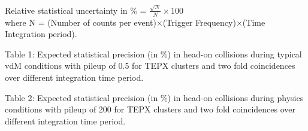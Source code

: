 Relative statistical uncertainty in $\%$ = $\frac{\sqrt{N}}{N} \times 100$ \\

where N = (Number of counts per event)$\times$(Trigger Frequency)$\times$(Time Integration period). \\

\newpage
\begin{flushleft} 
  Table 1: Expected statistical precision (in $\%$) in head-on collisions during typical vdM conditions with pileup of 0.5 for TEPX clusters and two fold coincidences over different integration time period.
\end{flushleft}  

\begin{center}
\end{center}

\begin{flushleft} 
Table 2: Expected statistical precision (in $\%$) in head-on collisions during physics conditions with pileup of 200 for TEPX clusters and two fold coincidences over different integration time period.
\end{flushleft} 

